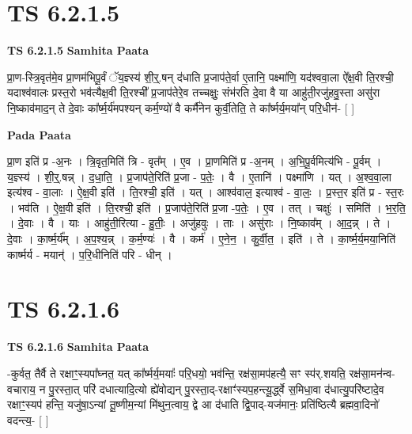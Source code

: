 \documentclass[17pt]{extarticle}
\begin{document}

\section{ TS 6.2.1.5 }

\textbf{TS 6.2.1.5 } \newline
\textbf{Samhita Paata} \newline

प्रा॒ण-स्त्रि॒वृत॑मे॒व प्रा॒णम॑भिपू॒र्वं ॅय॒ज्ञ्स्य॑ शी॒र्॒.षन् द॑धाति प्र॒जाप॑ते॒र्वा ए॒तानि॒ पक्ष्मा॑णि॒ यद॑श्ववा॒ला ऐ᳚क्ष॒वी ति॒रश्ची॒ यदाश्व॑वालः प्रस्त॒रो भव॑त्यैक्ष॒वी ति॒रश्ची᳚ प्र॒जाप॑तेरे॒व तच्चक्षुः॒ संभ॑रति दे॒वा वै या आहु॑ती॒रजु॑हवु॒स्ता असु॑रा नि॒ष्काव॑माद॒न् ते दे॒वाः का᳚र्ष्म॒र्य॑मपश्यन् कर्म॒ण्यो॑ वै कर्मै॑नेन कुर्वी॒तेति॒ ते का᳚र्ष्मर्य॒मया᳚न् परि॒धीन॑- [  ] \newline

\textbf{Pada Paata} \newline

प्रा॒ण इति॑ प्र -अ॒नः । त्रि॒वृत॒मिति॑ त्रि - वृत᳚म् । ए॒व । प्रा॒णमिति॑ प्र -अ॒नम् । अ॒भि॒पू॒र्वमित्य॑भि - पू॒र्वम् । य॒ज्ञ्स्य॑ । शी॒र्॒.षन्न् । द॒धा॒ति॒ । प्र॒जाप॑ते॒रिति॑ प्र॒जा - प॒तेः॒ । वै । ए॒तानि॑ । पक्ष्मा॑णि । यत् । अ॒श्व॒वा॒ला इत्य॑श्व - वा॒लाः । ऐ॒क्ष॒वी इति॑ । ति॒रश्ची॒ इति॑ । यत् । आश्व॑वाल॒ इत्याश्व॑ - वा॒लः॒ । प्र॒स्त॒र इति॑ प्र - स्त॒रः । भव॑ति । ऐ॒क्ष॒वी इति॑ । ति॒रश्ची॒ इति॑ । प्र॒जाप॑ते॒रिति॑ प्र॒जा -प॒तेः॒ । ए॒व । तत् । चक्षुः॑ । समिति॑ । भ॒र॒ति॒ । दे॒वाः । वै । याः । आहु॑ती॒रित्या - हु॒तीः॒ । अजु॑हवुः । ताः । असु॑राः । नि॒ष्काव᳚म् । आ॒द॒न्न् । ते । दे॒वाः । का॒र्ष्म॒र्य᳚म् । अ॒प॒श्य॒न्न् । क॒र्म॒ण्यः॑ । वै । कर्म॑ । ए॒ने॒न॒ । कु॒र्वी॒त॒ । इति॑ । ते । का॒र्ष्म॒र्य॒मया॒निति॑ कार्ष्मर्य - मयान्॑ । प॒रि॒धीनिति॑ परि - धीन् ।  \newline





\section{ TS 6.2.1.6 }

\textbf{TS 6.2.1.6 } \newline
\textbf{Samhita Paata} \newline

-कुर्वत॒ तैर्वै ते रक्षाꣳ॒॒स्यपा᳚घ्नत॒ यत् का᳚र्ष्मर्य॒मयाः᳚ परि॒धयो॒ भव॑न्ति॒ रक्ष॑सा॒मप॑हत्यै॒ सꣳ स्प॑र्.शयति॒ रक्ष॑सा॒मन॑न्व-वचाराय॒ न पु॒रस्ता॒त् परि॑ दधात्यादि॒त्यो ह्ये॑वोद्यन् पु॒रस्ता॒द्-रक्षाꣳ॑स्यप॒हन्त्यू॒र्द्ध्वे स॒मिधा॒वा द॑धात्यु॒परि॑ष्टादे॒व रक्षाꣳ॒॒स्यप॑ हन्ति॒ यजु॑षा॒ऽन्यां तू॒ष्णीम॒न्यां मि॑थुन॒त्वाय॒ द्वे आ द॑धाति द्वि॒पाद्-यज॑मानः॒ प्रति॑ष्ठित्यै ब्रह्मवा॒दिनो॑ वदन्त्य॒- [  ] \newline
\end{document}
